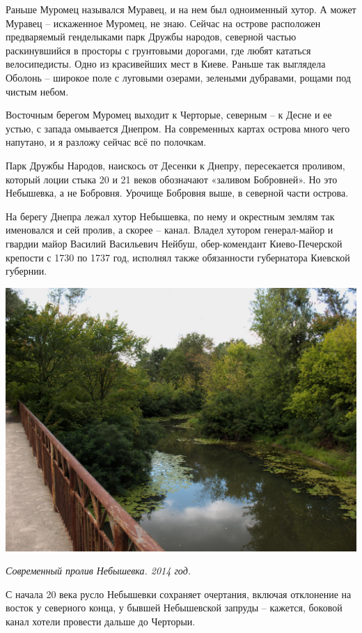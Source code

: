 Раньше Муромец назывался Муравец, и на нем был одноименный хутор. А может Муравец – искаженное Муромец, не знаю. Сейчас на острове расположен предваряемый генделыками парк Дружбы народов, северной частью раскинувшийся в просторы с грунтовыми дорогами, где любят кататься велосипедисты. Одно из красивейших мест в Киеве. Раньше так выглядела Оболонь – широкое поле с луговыми озерами, зелеными дубравами, рощами под чистым небом.

Восточным берегом Муромец выходит к Черторые, северным – к Десне и ее устью, с запада омывается Днепром. На современных картах острова много чего напутано, и я разложу сейчас всё по полочкам.

Парк Дружбы Народов, наискось от Десенки к Днепру, пересекается проливом, который лоции стыка 20 и 21 веков обозначают «заливом Бобровней». Но это Небышевка, а не Бобровня. Урочище Бобровня выше, в северной части острова.

На берегу Днепра лежал хутор Небышевка, по нему и окрестным землям так именовался и сей пролив, а скорее – канал. Владел хутором генерал-майор и гвардии майор Василий Васильевич Нейбуш, обер-комендант Киево-Печерской крепости с 1730 по 1737 год, исполнял также обязанности губернатора Киевской губернии.

\begin{center}
\includegraphics[width=0.80\linewidth]{chast-gorodki/cherto/s_mur_CRW_3939.jpg}

\textit{Современный пролив Небышевка. 2014 год.}
\end{center}

С начала 20 века русло Небышевки сохраняет очертания, включая отклонение на восток у северного конца, у бывшей Небышевской запруды – кажется, боковой канал хотели провести дальше до Черторыи.

